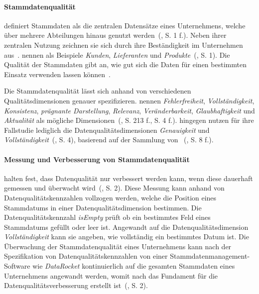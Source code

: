 \documentclass[
  language=german, %
  type=bachelor%
]{isthesis}
\begin{document}
\begin{content}
  \paragraph{Stammdatenqualität} \textsc{\citeauthor{otto2012design}} definiert
  Stammdaten als die zentralen Datensätze eines Unternehmens, welche über
  mehrere Abteilungen hinaus genutzt werden~(\citeyear{otto2012design}, S. 1
  f.).  Neben ihrer zentralen Nutzung zeichnen sie sich durch ihre
  Beständigkeit im Unternehmen aus~\cite[][S.  1]{knolmayer2006quality}.
  \textsc{\citeauthor{knolmayer2006quality}} nennen als Beispiele
  \textit{Kunden}, \textit{Lieferanten} und
  \textit{Produkte}~(\citeyear{knolmayer2006quality}, S. 1). Die Qualität der
  Stammdaten gibt an, wie gut sich die Daten für einen bestimmten Einsatz
  verwenden lassen können~\cite[][S.  8]{otto2011stammdatenmanagement}.

  Die Stammdatenqualität lässt sich anhand von verschiedenen
  Qualitätsdimensionen genauer spezifizieren.
  \textsc{\citeauthor{pipino2002data}} nennen \zB{} \textit{Fehlerfreiheit},
  \textit{Vollständigkeit}, \textit{Konsistenz}, \textit{prägnante
  Darstellung}, \textit{Relevanz}, \textit{Veränderbarkeit},
  \textit{Glaubhaftigkeit} und \textit{Aktualität} als mögliche
  Dimensionen~(\citeyear{pipino2002data, legner2007stammdaten}, S. 213 f., S. 4
  f.). \textsc{\citeauthor{baghi2013controlling}} hingegen nutzen für ihre
  Fallstudie lediglich die Datenqualitätsdimensionen \textit{Genauigkeit} und
  \textit{Vollständigkeit}~(\citeyear{baghi2013controlling}, S. 4), basierend
  auf der Sammlung von
  \textsc{\citeauthor{wand1996anchoring}}~(\citeyear{wand1996anchoring}, S. 8
  f.).

	\paragraph{Messung und Verbesserung von Stammdatenqualität}
	\textsc{\citeauthor{baghi2013controlling}} halten fest, dass Datenqualität
	nur verbessert werden kann, wenn diese dauerhaft gemessen und überwacht
  wird~(\cite{baghi2013controlling}, S. 2). Diese Messung kann anhand von
	Datenqualitätskennzahlen vollzogen werden, welche die Position eines
	Stammdatums in einer Datenqualitätsdimension bestimmen. Die
	Datenqualitätskennzahl \textit{isEmpty} prüft \zB{} ob ein bestimmtes Feld
	eines Stammdatums gefüllt oder leer ist. Angewandt auf die
	Datenqualitätsdimension \textit{Vollständigkeit} kann sie angeben, wie
	vollständig ein bestimmtes Datum ist. Die Überwachung der Stammdatenqualität
	eines Unternehmens kann nach der Spezifikation von Datenqualitätskennzahlen
	von einer Stammdatenmanagement-Software wie \zB{} \textit{DataRocket}
	kontinuierlich auf die gesamten Stammdaten eines Unternehmens angewandt
	werden, womit nach \textsc{\citeauthor{baghi2013controlling}} das Fundament
  für die Datenqualitätsverbesserung erstellt ist~(\citeyear{baghi2013controlling}, S. 2).


\end{content}
\end{document}
